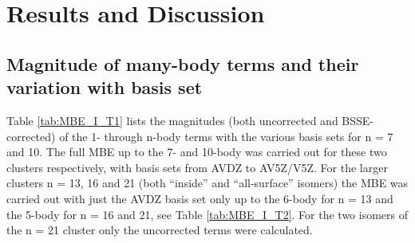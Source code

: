 \documentclass[11pt, proquest]{uwthesis}[2020/02/24]
\begin{document}
\section{Results and Discussion}\label{sec:3_results}
\subsection{Magnitude of many-body terms and their variation with basis set}

\par Table \ref{tab:MBE_I_T1} lists the magnitudes (both uncorrected and BSSE-corrected) of the 1- through n-body terms with the various basis sets for n = 7 and 10. The full MBE up to the 7- and 10-body was carried out for these two clusters respectively, with basis sets from AVDZ to AV5Z/V5Z. For the larger clusters n = 13, 16 and 21 (both “inside” and “all-surface” isomers) the MBE was carried out with just the AVDZ basis set only up to the 6-body for n = 13 and the 5-body for n = 16 and 21, see Table \ref{tab:MBE_I_T2}. For the two isomers of the n = 21 cluster only the uncorrected terms were calculated.


\end{document}
